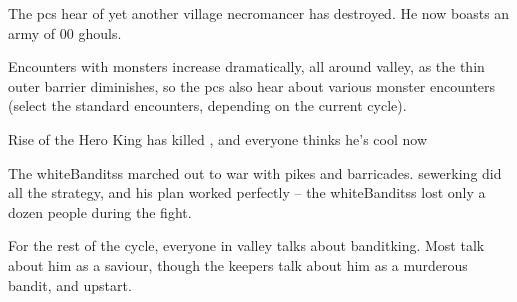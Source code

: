 The \glspl{pc} hear of yet another \gls{village} \gls{necromancer} has destroyed.
He now boasts an army of 00 ghouls.

Encounters with \glspl{monster} increase dramatically, all around \gls{valley}, as the thin outer barrier diminishes,%
so the \glspl{pc} also hear about various \gls{monster} encounters (select the standard encounters, depending on the current \gls{cycle}).

{Rise of the Hero King}%
{ has killed , and everyone thinks he's cool now}%

The \glspl{whiteBandits} marched out to war with pikes and barricades.
\Gls{sewerking} did all the strategy, and his plan worked perfectly -- the \glspl{whiteBandits} lost only a dozen people during the fight.

For the rest of the \gls{cycle}, everyone in \gls{valley} talks about \gls{banditking}.
Most talk about him as a saviour, though the \glspl{keeper} talk about him as a murderous bandit, and upstart.

